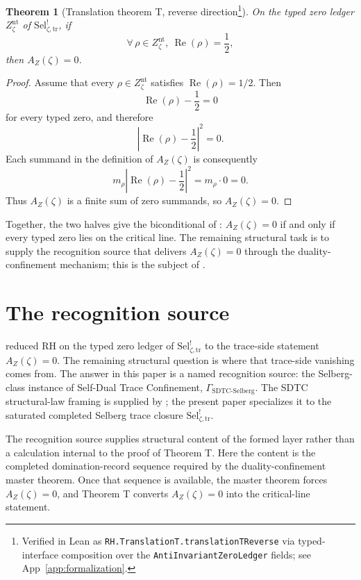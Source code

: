 \documentclass[11pt]{article}
\DeclareMathOperator{\Real}{Re}
\newcommand{\Znt}{Z_{\zeta}^{\mathrm{nt}}}
\newcommand{\AZ}{A_{Z}(\zeta)}
\newcommand{\Sel}{\mathrm{Sel}^{!}_{\zeta,\mathrm{tr}}}
\newcommand{\GamSDTCSelberg}{\Gamma_{\mathrm{SDTC\text{-}Selberg}}}
\newtheorem{theorem}{Theorem}[section]
\theoremstyle{definition}
\begin{document}
\begin{theorem}[Translation theorem T, reverse direction\footnote{Verified in Lean as \nolinkurl{RH.TranslationT.translationTReverse} via typed-interface composition over the \nolinkurl{AntiInvariantZeroLedger} fields; see App~\ref{app:formalization}.}]
\label{thm:rh:translation-T-reverse}
On the typed zero ledger \(\Znt\) of \(\Sel\), if
\[
  \forall\,\rho\in\Znt,\ \Real(\rho)=\frac{1}{2},
\]
then \(\AZ=0\).
\end{theorem}

\begin{proof}
Assume that every \(\rho\in\Znt\) satisfies \(\Real(\rho)=1/2\).
Then
\[
  \Real(\rho)-\frac{1}{2}=0
\]
for every typed zero, and therefore
\[
  \left|\Real(\rho)-\frac{1}{2}\right|^{2}=0.
\]
Each summand in the definition of \(\AZ\) is consequently
\[
  m_{\rho}\left|\Real(\rho)-\frac{1}{2}\right|^{2}
    =
  m_{\rho}\cdot 0
    =
  0.
\]
Thus \(\AZ\) is a finite sum of zero summands, so \(\AZ=0\).
\end{proof}

Together, the two halves give the biconditional of
: \(\AZ=0\) if and only if every typed
zero lies on the critical line.  The remaining structural task is
to supply the recognition source that delivers \(\AZ=0\) through
the duality-confinement mechanism; this is the subject of
.
 

\section{The recognition source}
\label{sec:recognition_source}

 reduced RH on the typed zero ledger
of \(\Sel\) to the trace-side statement \(\AZ=0\).  The remaining
structural question is where that trace-side vanishing comes from.
The answer in this paper is a named recognition source: the
Selberg-class instance of Self-Dual Trace Confinement,
\(\GamSDTCSelberg\).  The SDTC structural-law framing is supplied
by \cite{TsiokosSDTC2026}; the present paper specializes it to the
saturated completed Selberg trace closure \(\Sel\).

The recognition source supplies structural content of the formed
layer rather than a calculation internal to the proof of Theorem T.
Here the content is the completed domination-record sequence
required by the duality-confinement master theorem.  Once that
sequence is available, the master theorem forces \(\AZ=0\), and
Theorem T converts \(\AZ=0\) into the critical-line statement.
\end{document}
